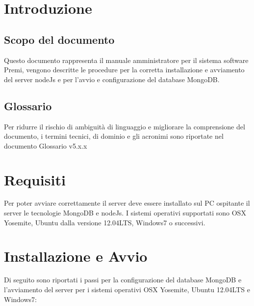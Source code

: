 \documentclass[a4paper,12pt]{article}
\title{\titoloDoc}
\newcommand{\parti}{./parti/}
\newcommand{\temp}{../../Template/}
\begin{document}
	\newpage
	\newpage
	\newpage
	\tableofcontents %
	\newpage
	\listoffigures
	\listoftables
	\newpage
	
\section{Introduzione}
\subsection{Scopo del documento}
Questo documento rappresenta il manuale amministratore per il sistema software Premi, vengono descritte le procedure per la corretta installazione e avviamento del server nodeJs  e per l'avvio e configurazione del database MongoDB.

\subsection{Glossario}
Per ridurre il rischio di ambiguità di linguaggio e migliorare la comprensione del documento, i termini tecnici, di dominio e gli acronimi sono riportate nel documento Glossario v5.x.x

\section{Requisiti}
Per poter avviare correttamente il server deve essere installato sul PC ospitante il server le tecnologie MongoDB e nodeJs. I sistemi operativi supportati sono OSX Yosemite, Ubuntu dalla versione 12.04LTS, Windows7 o successivi.

\section{Installazione e Avvio}

Di seguito sono riportati i passi per la configurazione del database MongoDB e l'avviamento del server per i sistemi operativi OSX Yosemite, Ubuntu  12.04LTS e Windows7:
\end{document}
